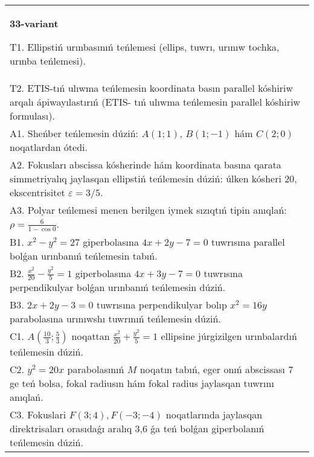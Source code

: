 \documentclass{article}
\begin{document}
\begin{tabular}{m{17cm}}
\textbf{33-variant}
\newline

T1. Ellipstiń urınbasınıń teńlemesi (ellips, tuwrı, urınıw tochka, urınba teńlemesi).\\

T2. ETIS-tıń ulıwma teńlemesin koordinata basın parallel kóshiriw arqalı ápiwayılastırıń (ETIS- tıń ulıwma teńlemesin parallel kóshiriw formulası).\\

A1. Sheńber teńlemesin dúziń: $A (1;1) $, $B (1;-1) $ hám $C (2;0) $ noqatlardan ótedi.\\

A2. Fokusları abscissa kósherinde hám koordinata basına qarata simmetriyalıq jaylasqan ellipstiń teńlemesin dúziń: úlken kósheri $20$, ekscentrisitet $\varepsilon=3/5$.\\

A3. Polyar teńlemesi menen berilgen iymek sızıqtıń tipin anıqlań: $\rho=\frac{6}{1-\cos 0}$.\\

B1. $x^{2} - y^{2} = 27$ giperbolasına $4x + 2y - 7 = 0$ tuwrısına parallel bolǵan urınbanıń teńlemesin tabıń.  \\

B2. $\frac{x^{2}}{20} - \frac{y^{2}}{5} = 1$ giperbolasına $4x + 3y - 7 = 0$ tuwrısına perpendikulyar bolǵan urınbanıń teńlemesin dúziń.  \\

B3. $2x + 2y - 3 = 0$ tuwrısına perpendikulyar bolıp $x^{2} = 16y$ parabolasına urınıwshı tuwrınıń teńlemesin dúziń.  \\

C1. $A(\frac{10}{3};\frac{5}{3})$ noqattan $\frac{x^{2}}{20} + \frac{y^{2}}{5} = 1$ ellipsine júrgizilgen urınbalardıń teńlemesin dúziń.  \\

C2. $y^{2} = 20x$ parabolasınıń $M$ noqatın tabıń, eger onıń abscissası 7 ge teń bolsa, fokal radiusın hám fokal radius jaylasqan tuwrını anıqlań.\\

C3. Fokuslari $F(3;4), F(-3;-4)$ noqatlarında jaylasqan direktrisaları orasıdaǵı aralıq 3,6 ǵa teń bolǵan giperbolanıń teńlemesin dúziń.  \\

\end{tabular}
\vspace{1cm}
\end{document}
